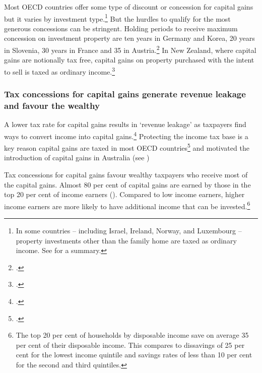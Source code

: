 \documentclass{grattan}\usepackage[]{graphicx}\usepackage[]{color}
\begin{document}
Most OECD countries offer some type of discount or concession for capital gains but it varies by investment type.\footnote{In some countries -- including Israel, Ireland, Norway, and Luxembourg -- property investments other than the family home are taxed as ordinary income. See \textcite{Harding2013} for a summary.}  But the hurdles to qualify for the most generous concessions can be stringent. Holding periods to receive maximum concession on investment property are ten years in Germany and Korea, 20 years in Slovenia, 30 years in France and 35 in Austria.\footcite{Harding2013} In New Zealand, where capital gains are notionally tax free, capital gains on property purchased with the intent to sell is taxed as ordinary income.\footcite[p.~25]{prebble2010tax} 
  
\subsubsection{Tax concessions for capital gains generate revenue leakage and favour the wealthy}
A lower tax rate for capital gains results in `revenue leakage' as taxpayers find ways to convert income into capital gains.\footcites{Evans2005}{Minas2013}  Protecting the income tax base is a key reason capital gains are taxed in most OECD countries\footcite{OECD2006b} and motivated the introduction of capital gains in Australia (see )

Tax concessions for capital gains favour wealthy taxpayers who receive most of the capital gains. Almost 80 per cent of capital gains are earned by those in the top 20 per cent of income earners (). Compared to low income earners, higher income earners are more likely to have additional income that can be invested.\footnote{The top 20 per cent of households by disposable income save on average 35 per cent of their disposable income. This compares to dissavings of 25 per cent for the lowest income quintile and savings rates of less than 10 per cent for the second and third quintiles.}
\end{document}
